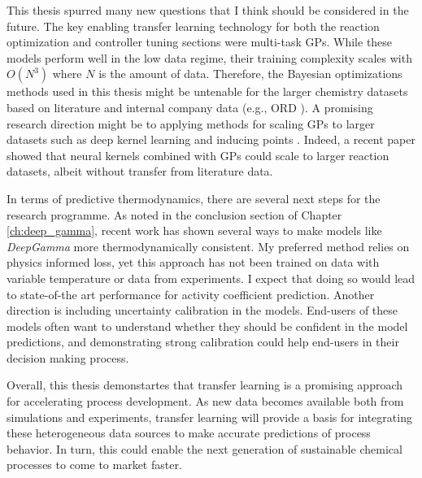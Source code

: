 This thesis spurred many new questions that I think should be considered in the future. The key enabling transfer learning technology for both the reaction optimization and controller tuning sections were multi-task GPs. While these models perform well in the low data regime, their training complexity scales with $O(N^3)$ where $N$ is the amount of data. Therefore, the Bayesian optimizations methods used in this thesis might be untenable for the larger chemistry datasets based on literature and internal company data (e.g., ORD \cite{ord}). A promising research direction might be to applying methods for scaling GPs to larger datasets such as deep kernel learning\cite{Wilson2016} and inducing points \cite{Quinonero2005}. Indeed, a recent paper showed that neural kernels combined with GPs could scale to larger reaction datasets, albeit without transfer from literature data.\cite{Angello2022}


In terms of predictive thermodynamics, there are several next steps for the research programme. As noted in the conclusion section of Chapter \ref{ch:deep_gamma}, recent work has shown several ways to make models like \textit{DeepGamma} more thermodynamically consistent. My preferred method relies on physics informed loss, yet this approach has not been trained on data with variable temperature or data from experiments. I expect that doing so would lead to state-of-the art performance for activity coefficient prediction. Another direction is including uncertainty calibration in the models. End-users of these models often want to understand whether they should be confident in the model predictions, and demonstrating strong calibration could help end-users in their decision making process.

Overall, this thesis demonstartes that transfer learning is a promising approach for accelerating process development. As new data becomes available both from simulations and experiments, transfer learning will provide a basis for integrating these heterogeneous data sources to make accurate predictions of process behavior. In turn, this could enable the next generation of sustainable chemical processes to come to market faster.
